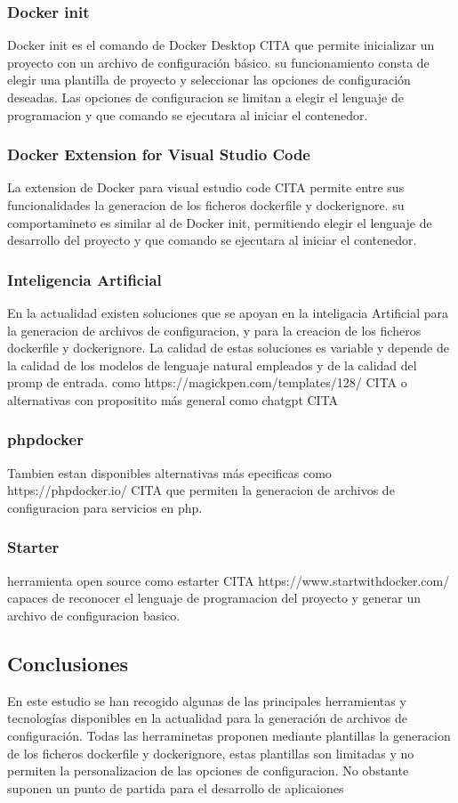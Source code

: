 \documentclass[12pt, a4paper, twoside]{article}
\begin{document}
\subsubsection{Docker init}
Docker init es el comando de Docker Desktop CITA que permite inicializar un proyecto con un archivo de configuración básico.
su funcionamiento consta de elegir una plantilla de proyecto y seleccionar las opciones de configuración deseadas.
Las opciones de configuracion se limitan a elegir el lenguaje de programacion y que comando se ejecutara al iniciar el contenedor.
\subsubsection{Docker Extension for Visual Studio Code}
La extension de Docker para visual estudio code CITA permite entre sus funcionalidades la generacion de los ficheros dockerfile y dockerignore.
su comportamineto es similar al de Docker init, permitiendo elegir el lenguaje de desarrollo del proyecto y que comando se ejecutara al iniciar el contenedor.
\subsubsection{Inteligencia Artificial}
En la actualidad existen soluciones que se apoyan en la inteligacia Artificial 
para la generacion de archivos de configuracion, y para la creacion 
de los ficheros dockerfile y dockerignore. La calidad de estas soluciones es variable y depende de la calidad de los modelos de lenguaje natural empleados y de la calidad del promp de entrada.
como https://magickpen.com/templates/128/ CITA o alternativas con propositito más general como chatgpt CITA
\subsubsection{phpdocker}
Tambien estan disponibles alternativas más epecificas como https://phpdocker.io/ CITA que permiten la generacion de archivos de configuracion para servicios en php.
\subsubsection{Starter}
herramienta open source como estarter CITA https://www.startwithdocker.com/ capaces de reconocer el lenguaje de programacion del proyecto y generar un archivo de configuracion basico.


\subsection{Conclusiones}
En este estudio se han recogido algunas de las principales herramientas y tecnologías disponibles en la actualidad para la generación de archivos de configuración.
Todas las herraminetas proponen mediante plantillas la generacion de los ficheros dockerfile y dockerignore, estas plantillas son limitadas y no permiten la personalizacion de las opciones de configuracion.
No obstante suponen un punto de partida para el desarrollo de aplicaiones 
\end{document}
